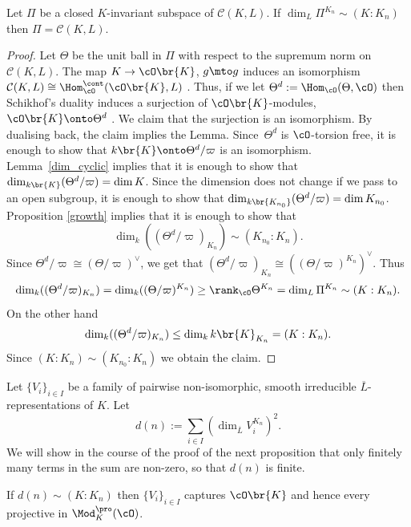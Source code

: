 \begin{lem}\label{cap_ban} Let $\Pi$ be a closed $K$-invariant subspace of
$\mathcal C(K, L)$. If $\dim_L \Pi^{K_n} \sim (K:K_n)$ then $\Pi= \mathcal C(K,
L)$.
\end{lem}

\begin{proof} Let $\Theta$ be the unit ball in $\Pi$ with respect to the supremum norm on $\mathcal C(K, L)$. The map
$K\to \cO\br{K}$, $g \mto g$ induces an isomorphism $\mathcal C(K, L)\cong \Hom^{\cont}_{\cO}(\cO\br{K}, L)$ \cite[Cor.\,2.2]{iw}.
Thus, if we let $\Theta^d:=\Hom_{\cO}(\Theta, \cO)$ then Schikhof's duality induces a surjection of $\cO\br{K}$-modules, $\cO\br{K}\onto \Theta^d$ \cite[Th.\,3.5]{iw}. We claim that the surjection is
an isomorphism. By dualising back, the claim implies the Lemma. Since~$\Theta^d$ is $\cO$\nobreakdash-torsion free, it is enough to show that $k\br{K}\onto \Theta^d/\varpi$ is an isomorphism.
Lemma~\ref{dim_cyclic} implies that it is enough to show that $\dim_{k\br{K}} ( \Theta^d/\varpi)= \dim K$. Since the dimension does not change if we pass to an open subgroup, it is enough
to show that $\dim_{k\br{K_{n_0}}} ( \Theta^d/\varpi)= \dim K_{n_0}$. Proposition \ref{growth} implies that it is enough to show that
\[
\dim_k (( \Theta^d/\varpi)_{K_n})\sim (K_{n_0} : K_n).
\]
Since
$\Theta^d/\varpi \cong (\Theta/\varpi)^{\vee}$, we get that $( \Theta^d/\varpi)_{K_n}\cong (( \Theta/\varpi)^{K_n})^{\vee}$. Thus
\[
\dim_k (( \Theta^d/\varpi)_{K_n})= \dim_k (( \Theta/\varpi)^{K_n}) \ge \rank_{\cO} \Theta^{K_n}= \dim_L \Pi^{K_n}\sim (K: K_n).
\]
On the other hand
\[
\dim_k (( \Theta^d/\varpi)_{K_n})\le \dim_k k\br{K}_{K_n}=(K:K_n).
\]
Since $(K: K_n)\sim (K_{n_0}: K_n)$ we obtain the claim.
\end{proof}

Let $\{V_i\}_{i\in I}$ be a family of pairwise non-isomorphic, smooth irreducible
$\overline{L}$\nobreakdash-represen\-tations of
$K$. Let
\[
d(n):= \sum_{i\in I} (\dim_{\overline{L}} V_i^{K_n})^2.
\]
We will show in the course of the proof of the next proposition that only finitely many terms in the sum are non-zero, so that $d(n)$ is finite.

\begin{prop}\label{criterion} If $d(n)\sim (K:K_n)$ then $\{V_i\}_{i\in I}$ captures $\cO\br{K}$ and hence every projective in
$\Mod^{\pro}_K(\cO)$.
\end{prop}

